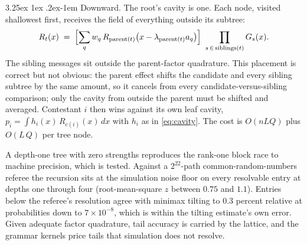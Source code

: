 \documentclass[11pt]{article}
\makeatletter
\renewcommand\paragraph{\@startsection{paragraph}{4}{\z@}%
  {3.25ex \@plus1ex \@minus.2ex}{-1em}%
  {\normalfont\normalsize\itshape}}
\makeatother
\begin{document}
\paragraph{Downward.} The root's cavity is one. Each node, visited shallowest
first, receives the field of everything outside its subtree:
\begin{equation}\label{eq:down}
R_t(x)\;=\;\Bigl[\sum_q w_q\,R_{\mathrm{parent}(t)}\!\left(x-\lambda_{\mathrm{parent}(t)}
a_q\right)\Bigr]\ \prod_{s\,\in\,\mathrm{siblings}(t)} G_s(x).
\end{equation}
The sibling messages sit outside the parent-factor quadrature. This
placement is correct but not obvious: the parent effect shifts the
candidate and every sibling subtree by the same amount, so it cancels
from every candidate-versus-sibling comparison; only the cavity from
outside the parent must be shifted and averaged. Contestant $i$ then wins against its own leaf cavity,
$p_i=\int h_i(x)\,R_{c(i)}(x)\,dx$ with $h_i$ as in \eqref{eq:cavity}. The cost
is $O(nLQ)$ plus $O(L\,Q)$ per tree node.

A depth-one tree with zero strengths reproduces the rank-one block race to machine
precision, which is tested. Against a $2^{22}$-path common-random-numbers
referee the recursion sits at the simulation noise floor on every resolvable
entry at depths one through four (root-mean-square $z$ between $0.75$ and
$1.1$). Entries below the referee's resolution agree with minimax tilting
\citep{botev2017} to $0.3$ percent relative at probabilities down to
$7\times10^{-8}$, which is within the tilting estimate's own error. Given
adequate factor quadrature, tail accuracy is carried by the lattice, and the
grammar kernels price tails that simulation does not resolve.
\end{document}
